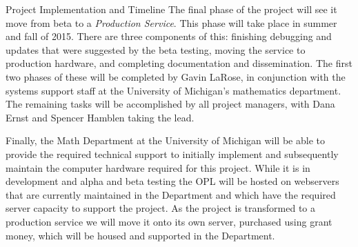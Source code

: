 \documentclass[11pt]{article}
\begin{document}
\begin{section}{Project Implementation and Timeline}
The final phase of the project will see it move from beta to a
\emph{Production Service}.  This phase will take place in summer and fall
of 2015.  There are three components of this: finishing debugging and
updates that were suggested by the beta testing, moving the service to
production hardware, and completing documentation and dissemination.  The
first two phases of these will be completed by Gavin LaRose, in
conjunction with the systems support staff at the University of Michigan's
mathematics department.  The remaining tasks will be accomplished by all
project managers, with Dana Ernst and Spencer Hamblen taking the lead.

Finally, the Math Department at the University of Michigan will be able to
provide the required technical support to initially implement and
subsequently maintain the computer hardware required for this project.
While it is in development and alpha and beta testing the OPL will be
hosted on webservers that are currently maintained in the Department and
which have the required server capacity to support the project.  As the
project is transformed to a production service we will move it onto its
own server, purchased using grant money, which will be housed and
supported in the Department.

\end{section}
\end{document}
